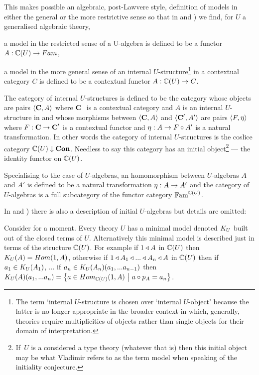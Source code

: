 {This makes possible an  algebraic, post-Lawvere
style,  definition of models in either the general or the more restrictive sense so that in 
\cite{Cartmell78} and  \cite{Cartmell86}) we find,
for $U$ a generalised algebraic theory, 
\begin{point}
 a model in the restricted sense of a U-algebra is defined to be a functor $A: \ccat[C](U) \morph Fam$, 
\end{point}
\begin{point}
a model in the more general sense of an internal $U$-structure\footnote{The  term `internal $U$-structure is chosen over `internal $U$-object' because the latter
is no longer appropriate in the broader context in which, generally, theories require multiplicities of objects rather than single objects for their domain of interpretation.} in a contextual category
$C$ is defined to be a contextual functor $A: \ccat[C](U) \morph C$.
\end{point}
The category of internal $U$-structures is defined to be the category whose objects
are pairs $\tuple{\catc,A}$ 
where $\catcw$ is a contextual 
category and $A$ is an internal 
$U$-structure in
 \catcw and whose morphisms between $\tuple{\catc,A}$ and $\tuple{\catc',A'}$ are pairs $\tuple{F, \eta}$ where
$F: \catc \morph \catc'$ is a contextual functor and $\eta: A  \morph  F \circ A'$ is a natural transformation.
In other words the category of internal $U$-structures
is  the coslice category
$\CofU \downarrow \catCon$. Needless to say this category has an initial object\footnote{If\ $U$ is a considered a type theory (whatever that is) then 
this initial object may be what Vladimir  refers
to as the term model when speaking of the initiality conjecture.}
--- the identity functor on  $\CofU$.
 
Specialising to the case of $U$-algebras,  
an homomorphism between $U$-algebras $A$ and $A'$ is defined to be a 
natural transformation $\eta: A \morph A'$ and the category of $U$-algebras is a full subcategory of the 
functor category $\Fam^{\CofU}$. 


In \cite{Cartmell78} and  \cite{Cartmell86}) there is also a description of initial $U$-algebras but details are omitted:
\begin{tightquote}
Consider for a moment. Every theory $U$ has a minimal model denoted $\KU$ built out of the closed terms of $U$. Alternatively this minimal model is described just in terms of the structure $\CofU$. For example
if $1 \base A$ in $\CofU$ then 
$\KU(A)=Hom(1,A)$, otherwise if $1 \base A_1 \base ... \base A_n \base A$ in $\CofU$
then if $a_1 \in \KU(A_1)$, ... if $a_n \in \KU(A_n)(a_1,...a_{n-1})$ then 
$\KU(A)(a_1,...a_n)=\setsuchthat{a\in Hom_{\CofU}(1,A)}{a \circ p_A = a_n}$. \\
\end{tightquote} 

}
